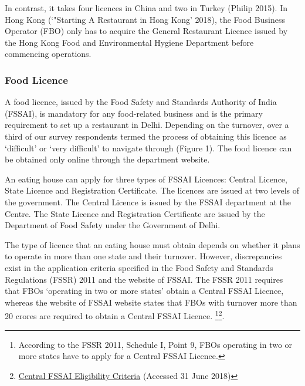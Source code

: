 \documentclass[a4paper, 12pt]{article}
\begin{document}
                   In contrast, it takes four licences in China and two in Turkey (Philip 2015). In Hong Kong (‘"Starting A Restaurant in Hong Kong’ 2018), the Food Business Operator (FBO) only has to acquire the General Restaurant Licence issued by the Hong Kong Food and Environmental Hygiene Department before commencing operations.
                    
                                        
                    \subsubsection{Food Licence}
                    A food licence, issued by the Food Safety and Standards Authority of India (FSSAI), is mandatory for any food-related business and is the primary requirement to set up a restaurant in Delhi. Depending on the turnover, over a third of our survey respondents termed the process of obtaining this licence as ‘difficult’ or ‘very difficult’ to navigate through (Figure 1). The food licence can be obtained only online through the department website.
                    
                    An eating house can apply for three types of FSSAI Licences: Central Licence, State Licence and Registration Certificate. The licences are issued at two levels of the government. The Central Licence is issued by the FSSAI department at the Centre. The State Licence and Registration Certificate are issued by the Department of Food Safety under the Government of Delhi.
                    
                    The type of licence that an eating house must obtain depends on whether it plans to operate in more than one state and their turnover. However, discrepancies exist in the application criteria specified in the Food Safety and Standards Regulations (FSSR) 2011 and the website of FSSAI. The FSSR 2011 requires that FBOs ‘operating in two or more states’ obtain a Central FSSAI Licence, whereas the website of FSSAI website states that FBOs with turnover more than 20 crores are required to obtain a Central FSSAI Licence. \footnote{According to the FSSR 2011, Schedule I, Point 9, FBOs operating in two or more states have to apply for a Central FSSAI Licence.}\footnote{\href{https://bit.ly/2pbFEXM}{Central FSSAI Eligibility Criteria} (Accessed 31 June 2018)}.%
                    
\end{document}

